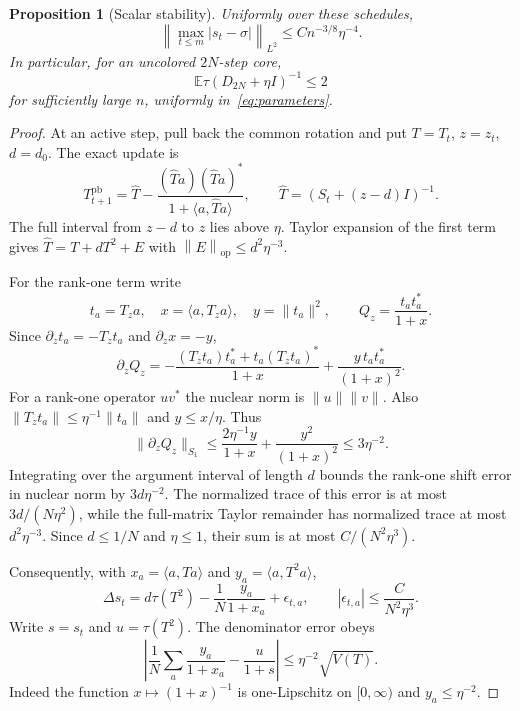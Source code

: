 \documentclass[11pt]{article}
\newtheorem{proposition}[theorem]{Proposition}
\theoremstyle{definition}\newtheorem{definition}[theorem]{Definition}
\theoremstyle{remark}\newtheorem{remark}[theorem]{Remark}
\newcommand{\E}{\mathbb E}
\newcommand{\op}{\mathrm{op}}
\newcommand{\ip}[2]{\langle#1,#2\rangle}
\newcommand{\norm}[1]{\left\lVert#1\right\rVert}
\begin{document}
\begin{proposition}[Scalar stability]\label{prop:scalar}
Uniformly over these schedules,
\begin{equation}\label{eq:scalar-stability}
 \left\|\max_{t\le m}|s_t-\sigma|\right\|_{L^2}
 \le C n^{-3/8}\eta^{-4}.
\end{equation}
In particular, for an uncolored $2N$-step core,
\begin{equation}\label{eq:scalar-final}
 \E\tau(D_{2N}+\eta I)^{-1}\le2
\end{equation}
for sufficiently large $n$, uniformly in~\eqref{eq:parameters}.
\end{proposition}
\begin{proof}
At an active step, pull back the common rotation and put $T=T_t$, $z=z_t$, $d=d_0$. The exact update is
\begin{equation}\label{eq:exact-resolvent}
 T_{t+1}^{\mathrm{pb}}
 =\widehat T-\frac{(\widehat T a)(\widehat T a)^*}
                       {1+\ip a{\widehat T a}},\qquad
 \widehat T=(S_t+(z-d)I)^{-1}.
\end{equation}
The full interval from $z-d$ to $z$ lies above $\eta$. Taylor expansion of the first term gives
$\widehat T=T+dT^2+E$ with $\norm E_{\op}\le d^2\eta^{-3}$.

For the rank-one term write
\[
 t_a=T_za,\quad x=\langle a,T_za\rangle,\quad y=\|t_a\|^2,
 \qquad Q_z=\frac{t_at_a^*}{1+x}.
\]
Since $\partial_z t_a=-T_zt_a$ and $\partial_zx=-y$,
\begin{equation}\label{eq:rank-derivative-expanded}
 \partial_zQ_z
 =-\frac{(T_zt_a)t_a^*+t_a(T_zt_a)^*}{1+x}
   +\frac{y\,t_at_a^*}{(1+x)^2}.
\end{equation}
For a rank-one operator $uv^*$ the nuclear norm is $\|u\|\|v\|$. Also
$\|T_zt_a\|\le\eta^{-1}\|t_a\|$ and $y\le x/\eta$. Thus
\[
 \|\partial_zQ_z\|_{S_1}
 \le\frac{2\eta^{-1}y}{1+x}+\frac{y^2}{(1+x)^2}
 \le3\eta^{-2}.
\]
Integrating over the argument interval of length $d$ bounds the rank-one shift error in nuclear norm by $3d\eta^{-2}$. The normalized trace of this error is at most $3d/(N\eta^2)$, while the full-matrix Taylor remainder has normalized trace at most $d^2\eta^{-3}$. Since $d\le1/N$ and $\eta\le1$, their sum is at most $C/(N^2\eta^3)$.


Consequently, with $x_a=\ip a{Ta}$ and $y_a=\ip a{T^2a}$,
\begin{equation}\label{eq:trace-increment}
 \Delta s_t=d\tau(T^2)-\frac1N\frac{y_a}{1+x_a}+\epsilon_{t,a},
 \qquad |\epsilon_{t,a}|\le\frac C{N^2\eta^3}.
\end{equation}
Write $s=s_t$ and $u=\tau(T^2)$. The denominator error obeys
\[
 \left|\frac1N\sum_a\frac{y_a}{1+x_a}-\frac u{1+s}\right|
 \le\eta^{-2}\sqrt{V(T)}.
\]
Indeed the function $x\mapsto(1+x)^{-1}$ is one-Lipschitz on $[0,\infty)$ and $y_a\le\eta^{-2}$.


\end{proof}
\end{document}
